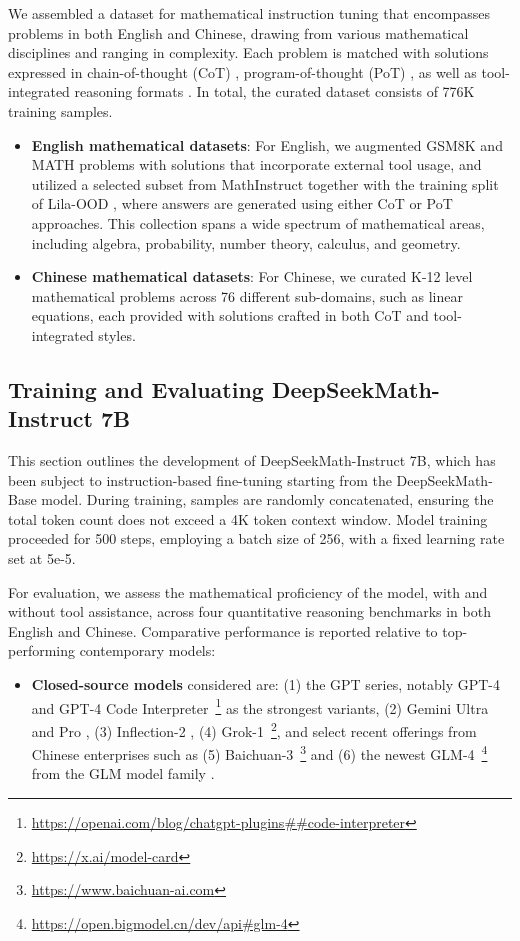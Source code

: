 We assembled a dataset for mathematical instruction tuning that encompasses problems in both English and Chinese, drawing from various mathematical disciplines and ranging in complexity. Each problem is matched with solutions expressed in chain-of-thought (CoT) \citep{cot}, program-of-thought (PoT) \citep{pot,pal}, as well as tool-integrated reasoning formats \citep{tora}. In total, the curated dataset consists of 776K training samples.

\begin{itemize}[topsep=0pt]
    \item \textbf{English mathematical datasets}: For English, we augmented GSM8K and MATH problems with solutions that incorporate external tool usage, and utilized a selected subset from MathInstruct \citep{MathInstruct} together with the training split of Lila-OOD \citep{lila}, where answers are generated using either CoT or PoT approaches. This collection spans a wide spectrum of mathematical areas, including algebra, probability, number theory, calculus, and geometry.
    \item \textbf{Chinese mathematical datasets}: For Chinese, we curated K-12 level mathematical problems across 76 different sub-domains, such as linear equations, each provided with solutions crafted in both CoT and tool-integrated styles.
\end{itemize}

\subsection{Training and Evaluating DeepSeekMath-Instruct 7B}

This section outlines the development of DeepSeekMath-Instruct 7B, which has been subject to instruction-based fine-tuning starting from the DeepSeekMath-Base model. During training, samples are randomly concatenated, ensuring the total token count does not exceed a 4K token context window. Model training proceeded for 500 steps, employing a batch size of 256, with a fixed learning rate set at 5e-5.

For evaluation, we assess the mathematical proficiency of the model, with and without tool assistance, across four quantitative reasoning benchmarks in both English and Chinese. Comparative performance is reported relative to top-performing contemporary models:

\begin{itemize}[topsep=0pt]
    \item \textbf{Closed-source models} considered are: (1) the GPT series, notably GPT-4 \citep{gpt4} and GPT-4 Code Interpreter~\footnote{\url{https://openai.com/blog/chatgpt-plugins\#\#code-interpreter}} as the strongest variants, (2) Gemini Ultra and Pro \citep{gemini}, (3) Inflection-2 \citep{inflection-2}, (4) Grok-1~\footnote{\url{https://x.ai/model-card}}, and select recent offerings from Chinese enterprises such as (5) Baichuan-3~\footnote{\url{https://www.baichuan-ai.com}} and (6) the newest GLM-4~\footnote{\url{https://open.bigmodel.cn/dev/api\#glm-4}} from the GLM model family \citep{glm}.
\end{itemize}

